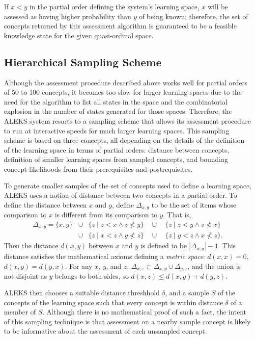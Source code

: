 \documentclass[11pt]{llncs}
\begin{document}
{If $x<y$ in the partial order defining the system's learning space, $x$ will be assessed as having higher probability than $y$ of being known; therefore, the set of concepts returned by this assessment algorithm is guaranteed to be a feasible knowledge state for the given quasi-ordinal space.

\subsection{Hierarchical Sampling Scheme}

Although the assessment procedure described above works well for partial orders of 50 to 100 concepts, it becomes too slow for larger learning spaces due to the need for the algorithm to list all states in the space and the combinatorial explosion in the number of states generated for those spaces. Therefore, the ALEKS system resorts to a sampling scheme that allows its assessment procedure to run at interactive speeds for much larger learning spaces. This sampling scheme is based on three concepts, all depending on the details of the definition of the learning space in terms of partial orders: distance between concepts, definition of smaller learning spaces from sampled concepts, and bounding concept likelihoods from their prerequisites and postrequisites.

To generate smaller samples of the set of concepts used to define a learning space, ALEKS uses a notion of distance between two concepts in a partial order. To define the distance between $x$ and $y$,
define $\Delta_{x,y}$ to be the set of items whose comparison to $x$ is different from its comparison to $y$. That is,
\begin{eqnarray*}
\Delta_{x,y}=\{x,y\}&\cup&
\{z\mid z<x \wedge z\not<y\}\quad \cup \quad
\{z\mid z<y \wedge z\not<x\}\\
&\cup&\{z\mid x<z \wedge y\not<z\}\quad \cup\quad
\{z\mid y<z \wedge x\not<z\}.
\end{eqnarray*}
Then the distance $d(x,y)$ between $x$ and $y$ is defined to be $|\Delta_{x,y}|-1$.
This distance satisfies the mathematical axioms defining a \emph{metric space}: $d(x,x)=0$, $d(x,y)=d(y,x)$. For any $x$, $y$, and $z$,
$\Delta_{x,z}\subset\Delta_{x,y}\cup\Delta_{y,z}$, and the union is not disjoint as $y$ belongs to both sides, so $d(x,z)\le d(x,y)+d(y,z)$.

ALEKS then chooses a suitable distance threshhold $\delta$, and a sample $S$ of the concepts of the learning space such that every concept is within distance $\delta$ of a member of $S$. Although there is no mathematical proof of such a fact, the intent of this sampling technique is that assessment on a nearby sample concept is likely to be informative about the assessment of each unsampled concept.

}
\end{document}

